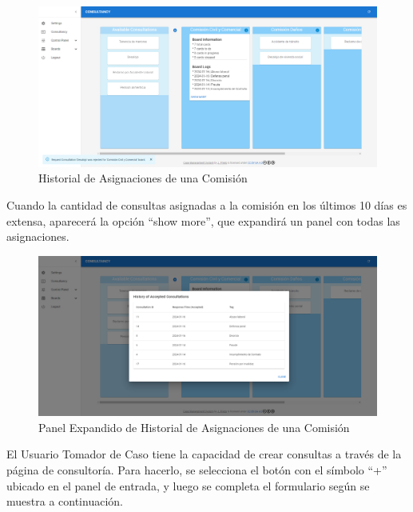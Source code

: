 \begin{figure}[H]
    \centering
    \includegraphics[width=1\linewidth]{fig/consultancy-real-page-logs-1.png}
    \caption{Historial de Asignaciones de una Comisión}
    \label{fig:consultancy-logs-1}
\end{figure}

Cuando la cantidad de consultas asignadas a la comisión en los últimos 10 días es extensa, aparecerá la opción ``show more'', que expandirá un panel con todas las asignaciones.

\begin{figure}[H]
    \centering
    \includegraphics[width=1\linewidth]{fig/consultancy-real-page-logs-2.png}
    \caption{Panel Expandido de Historial de Asignaciones de una Comisión}
    \label{fig:consultancy-logs-2}
\end{figure}

El Usuario Tomador de Caso tiene la capacidad de crear consultas a través de la página de consultoría. Para hacerlo, se selecciona el botón con el símbolo ``+'' ubicado en el panel de entrada, y luego se completa el formulario según se muestra a continuación.


